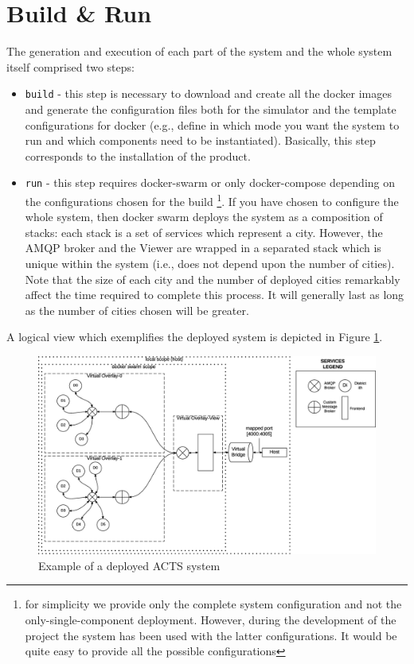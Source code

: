 \section{Build \& Run}
The generation and execution of each part of the system and
the whole system itself comprised two steps:

\begin{itemize}
   \item \texttt{build} - this step is necessary to download and create all the docker
   images and generate the configuration files both for the simulator and the
   template configurations for docker
   (e.g., define in which mode you want the system to run and
   which components need to be instantiated).
	Basically, this step
   corresponds to the installation of the product.
   \item \texttt{run} - this step requires docker-swarm
	or only docker-compose depending on the configurations chosen for the build
	\footnote{for simplicity we provide only the complete system configuration and not the
	only-single-component deployment. However, during the development of the project
	the system has been used with the latter configurations.
	It would be quite easy to provide all the possible configurations}.
	If you have chosen to configure the whole system, then docker swarm deploys the system
   as a composition of stacks: each stack is a set of services which represent
   a city. However, the AMQP broker and the Viewer are wrapped in a separated
   stack which is unique within the system (i.e., does not depend upon the
   number of cities). Note that the size of each city and the number of deployed
   cities remarkably affect the time required to complete this process.
	It will generally last as long as the number of cities chosen will be greater.
\end{itemize}

A logical view which exemplifies the deployed system is depicted in Figure
\ref{fig:deploy-sys}.

\begin{figure}[H]
\centering
\includegraphics[scale=0.5,keepaspectratio]{images/user-man/eps/deploy.eps}
\caption{Example of a deployed ACTS system}
\label{fig:deploy-sys}
\end{figure}
